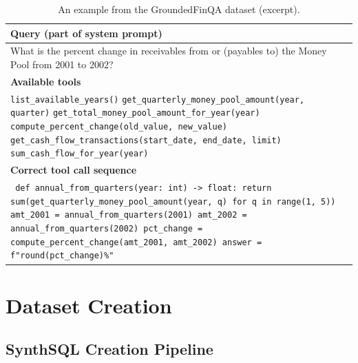 \documentclass[11pt]{article}
\newcommand{\synthsubset}{SynthSQL\xspace}
\newcommand{\groundedfinqa}{GroundedFinQA\xspace}
\begin{document}
\begin{table}[t]
\centering
\small
\begin{tabular}{p{}}
\toprule
\textbf{Query (part of system prompt)} \\
\midrule
What is the percent change in receivables from or (payables to) the Money Pool from 2001 to 2002? \\
\midrule
\textbf{Available tools} \\
\midrule
\texttt{list\_available\_years()}\newline
\texttt{get\_quarterly\_money\_pool\_amount(year, quarter)}\newline
\texttt{get\_total\_money\_pool\_amount\_for\_year(year)}\newline
\texttt{compute\_percent\_change(old\_value, new\_value)}\newline
\texttt{get\_cash\_flow\_transactions(start\_date, end\_date, limit)}\newline
\texttt{sum\_cash\_flow\_for\_year(year)} \\
\midrule
\textbf{Correct tool call sequence} \\
\midrule
\texttt{%
def annual\_from\_quarters(year: int) -> float: \newline
\hspace*{2em} return sum(get\_quarterly\_money\_pool\_amount(year, q) for q in range(1, 5)) \newline
amt\_2001 = annual\_from\_quarters(2001) \newline
amt\_2002 = annual\_from\_quarters(2002) \newline
pct\_change = compute\_percent\_change(amt\_2001, amt\_2002) \newline
answer = f"{round(pct\_change)}\%"} \\
\bottomrule
\end{tabular}
\caption{An example from the \groundedfinqa dataset (excerpt).}
\label{tab:example}
\end{table}


\section{Dataset Creation}

\subsection{\synthsubset Creation Pipeline}
\label{sec:synthsql_pipeline}
\end{document}
